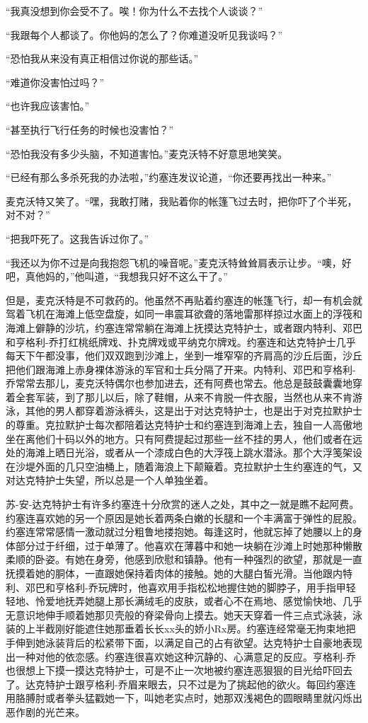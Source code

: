     “我真没想到你会受不了。唉！你为什么不去找个人谈谈？”

    “我跟每个人都谈了。你他妈的怎么了？你难道没听见我谈吗？”

    “恐怕我从来没有真正相信过你说的那些话。”

    “难道你没害怕过吗？”

    “也许我应该害怕。”

    “甚至执行飞行任务的时候也没害怕？”

    “恐怕我没有多少头脑，不知道害怕。”麦克沃特不好意思地笑笑。

    “已经有那么多杀死我的办法啦，”约塞连发议论道，“你还要再找出一种来。”

    麦克沃特又笑了。“嘿，我敢打赌，我贴着你的帐篷飞过去时，把你吓了个半死，对不对？”

    “把我吓死了。这我告诉过你了。”

    “我还以为你不过是向我抱怨飞机的噪音呢。”麦克沃特耸耸肩表示让步。“噢，好吧，真他妈的，”他叫道，“我想我只好不这么干了。”

    但是，麦克沃特是不可救药的。他虽然不再贴着约塞连的帐篷飞行，却一有机会就驾着飞机在海滩上低空盘旋，如同一串震耳欲聋的落地雷那样掠过水面上的浮筏和海滩上僻静的沙坑，约塞连常常躺在海滩上抚摸达克特护士，或者跟内特利、邓巴和亨格利-乔打红桃纸牌戏、扑克牌戏或平纳克尔牌戏。约塞连和达克特护士几乎每天下午都没事，他们双双跑到沙滩上，坐到一堆窄窄的齐肩高的沙丘后面，沙丘把他们跟海滩上赤身裸体游泳的军官和士兵分隔了开来。内特利、邓巴和亨格利-乔常常去那儿，麦克沃特偶尔也参加进去，还有阿费也常去。他总是鼓鼓囊囊地穿着全套军装，到了那儿以后，除了鞋帽，从来不肯脱一件衣服，当然也从来不肯游泳，其他的男人都穿着游泳裤头，这是出于对达克特护士，也是出于对克拉默护士的尊重。克拉默护士每次都陪着达克特护士和约塞连到海滩上去，独自一人高傲地坐在离他们十码以外的地方。只有阿费提起过那些一丝不挂的男人，他们或者在远处的海滩上晒日光浴，或者从一个漆成白色的大浮筏上跳水潜泳。那个大浮笺架设在沙堤外面的几只空油桶上，随着海浪上下颠簸着。克拉默护士生约塞连的气，又对达克特护士失望，所以总是一个人单独坐着。
 


    苏-安-达克特护士有许多约塞连十分欣赏的迷人之处，其中之一就是瞧不起阿费。约塞连喜欢她的另一个原因是她长着两条白嫩的长腿和一个丰满富于弹性的屁股。约塞连常常感情一激动就过分粗鲁地搂抱她。每逢这时，他就忘掉了她腰以上的身体部分过于纤细，过于单薄了。他喜欢在薄暮中和她一块躺在沙滩上时她那种懒散柔顺的卧姿。有她在身旁，他感到欣慰和镇静。他有一种强烈的欲望，那就是一直抚摸着她的胴体，一直跟她保持着肉体的接触。她的大腿白皙光滑。当他跟内特利、邓巴和亨格利-乔玩牌时，他喜欢用手指松松地握住她的脚脖子，用手指甲轻轻地、怜爱地抚弄她腿上那长满绒毛的皮肤，或者心不在焉地、感觉愉快地、几乎无意识地伸手顺着她那贝壳般的脊梁骨向上摸去。她天天穿着一件三点式泳装，泳装的上半截刚好能遮住她那垂着长长xx头的娇小Rx房。约塞连经常毫无拘束地把手伸到她泳装背后的松紧带下面，以满足自己的占有欲望。达克特护士自豪地表现出一种对他的依恋感。约塞连很喜欢她这种沉静的、心满意足的反应。亨格利-乔也很想上下摸一摸达克特护士，可是不止一次地被约塞连恶狠狠的目光给吓回去了。达克特护士跟亨格利-乔眉来眼去，只不过是为了挑起他的欲火。每回约塞连用胳膊肘或者拳头猛戳她一下，叫她老实点时，她那双浅褐色的圆眼睛里就闪烁出恶作剧的光芒来。

